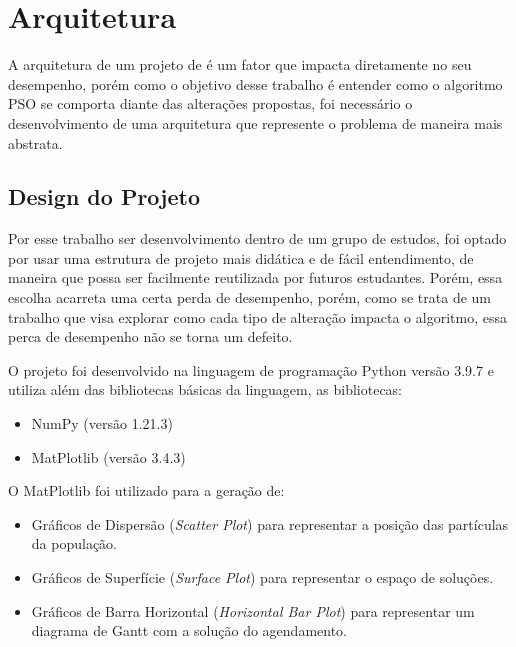 \section{Arquitetura}
        A arquitetura de um projeto de é um fator que impacta diretamente no seu desempenho, porém como o objetivo desse trabalho é entender como o algoritmo PSO se comporta diante das alterações propostas, foi necessário o desenvolvimento de uma arquitetura que represente o problema de maneira mais abstrata.

    \subsection{Design do Projeto}
        Por esse trabalho ser desenvolvimento dentro de um grupo de estudos, foi optado por usar uma estrutura de projeto mais didática e de fácil entendimento, de maneira que possa ser facilmente reutilizada por futuros estudantes. Porém, essa escolha acarreta uma certa perda de desempenho, porém, como se trata de um trabalho que visa explorar como cada tipo de alteração impacta o algoritmo, essa perca de desempenho não se torna um defeito.\hfill\vspace{\onelineskip}
        
        O projeto foi desenvolvido na linguagem de programação Python versão 3.9.7 e utiliza além das bibliotecas básicas da linguagem, as bibliotecas:
        \begin{itemize}
            \item NumPy (versão 1.21.3)
            \item MatPlotlib (versão 3.4.3)
        \end{itemize}

        \hfill\newline
        \noindent O MatPlotlib foi utilizado para a geração de: 
        \begin{itemize}
            \item Gráficos de Dispersão (\textit{Scatter Plot}) para representar a posição das partículas da população.
            \item Gráficos de Superfície (\textit{Surface Plot}) para representar o espaço de soluções.
            \item Gráficos de Barra Horizontal (\textit{Horizontal Bar Plot}) para representar um diagrama de Gantt com a solução do agendamento.
        \end{itemize}
        
